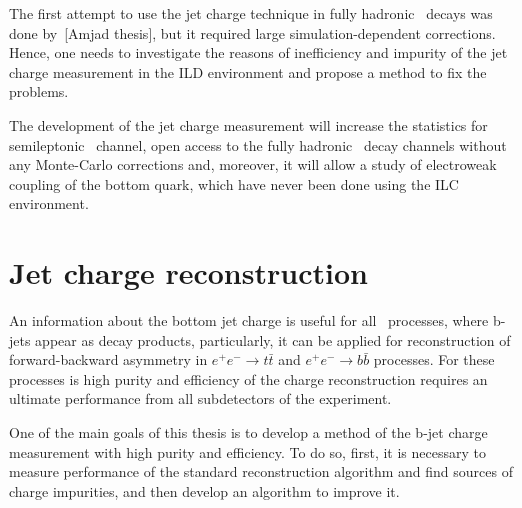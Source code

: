 The first attempt to use the jet charge technique in fully hadronic \ttbar\ decays was done by~[Amjad thesis], but it required large simulation-dependent corrections. 
Hence, one needs to investigate the reasons of inefficiency and impurity of the jet charge measurement in the ILD environment and propose a method to fix the problems. 



The development of the jet charge measurement will increase the statistics for semileptonic \ttbar\ channel,  open access to the fully hadronic \ttbar\ decay channels without any Monte-Carlo corrections and, moreover, it will allow a study of electroweak coupling of the bottom quark, which have never been done using the ILC environment. 




\section{Jet charge reconstruction}
\label{sec:JetChargeReconstruction}
An information about the bottom jet charge is useful for all \sm\ processes, where b-jets appear as decay products, particularly, it can be applied for reconstruction of forward-backward asymmetry in $e^+e^-\to t\bar{t}$ and $e^+e^- \to b\bar{b}$ processes. 
For these processes is high purity and efficiency of the charge reconstruction requires an ultimate performance from all subdetectors of the experiment. 

One of the main goals of this thesis is to develop a method of the b-jet charge measurement with high purity and efficiency. 
To do so, first, it is necessary to measure performance of the standard reconstruction algorithm and find sources of charge impurities, and then develop an algorithm to improve it. 


